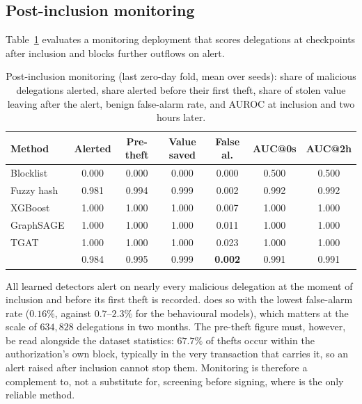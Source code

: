 \subsection{Post-inclusion monitoring}
\label{sec:res-monitor}
Table~\ref{tab:monitor} evaluates a monitoring deployment that scores delegations at checkpoints after inclusion and blocks further outflows on alert.

\begin{table}[t]
\centering
\caption{Post-inclusion monitoring (last zero-day fold, mean over seeds): share of malicious delegations alerted, share alerted before their first theft, share of stolen value leaving after the alert, benign false-alarm rate, and AUROC at inclusion and two hours later.}
\label{tab:monitor}
\footnotesize
\setlength{\tabcolsep}{2.2pt}
\begin{tabular}{lcccccc}
\toprule
Method & Alerted & Pre-theft & Value saved & False al. & AUC@0s & AUC@2h \\
\midrule
Blocklist & 0.000 & 0.000 & 0.000 & 0.000 & 0.500 & 0.500 \\
Fuzzy hash & 0.981 & 0.994 & 0.999 & 0.002 & 0.992 & 0.992 \\
XGBoost & 1.000 & 1.000 & 1.000 & 0.007 & 1.000 & 1.000 \\
GraphSAGE & 1.000 & 1.000 & 1.000 & 0.011 & 1.000 & 1.000 \\
TGAT & 1.000 & 1.000 & 1.000 & 0.023 & 1.000 & 1.000 \\
\textbf{\dn{}} & 0.984 & 0.995 & 0.999 & \textbf{0.002} & 0.991 & 0.991 \\
\bottomrule
\end{tabular}
\end{table}

All learned detectors alert on nearly every malicious delegation at the moment of inclusion and before its first theft is recorded. \dn{} does so with the lowest false-alarm rate ($0.16\%$, against $0.7$--$2.3\%$ for the behavioural models), which matters at the scale of $634{,}828$ delegations in two months. The pre-theft figure must, however, be read alongside the dataset statistics: $67.7\%$ of thefts occur within the authorization's own block, typically in the very transaction that carries it, so an alert raised after inclusion cannot stop them. Monitoring is therefore a complement to, not a substitute for, screening before signing, where \dn{} is the only reliable method.

